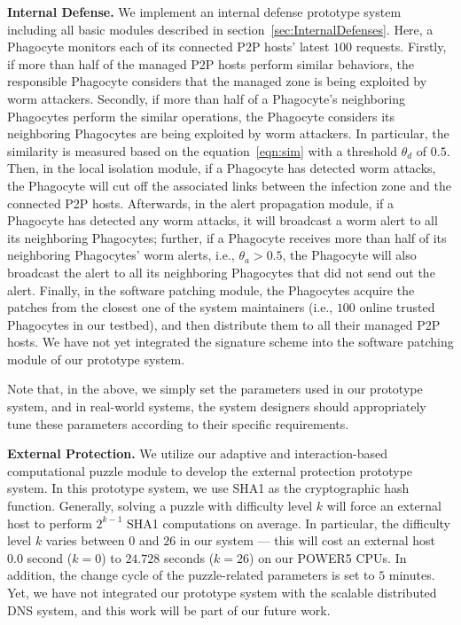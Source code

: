 \documentclass[times,10pt,twocolumn]{article}
\begin{document}
\textbf{Internal Defense.} We implement an internal defense
prototype system including all basic modules described in
section~\ref{sec:InternalDefenses}. Here, a Phagocyte monitors each
of its connected P2P hosts' latest $100$ requests. Firstly, if more
than half of the managed P2P hosts perform similar behaviors, the
responsible Phagocyte considers that the managed zone is being
exploited by worm attackers. Secondly, if more than half of a
Phagocyte's neighboring Phagocytes perform the similar operations,
the Phagocyte considers its neighboring Phagocytes are being
exploited by worm attackers. In particular, the similarity is
measured based on the equation~\ref{eqn:sim} with a threshold
$\theta_d$ of $0.5$. Then, in the local isolation module, if a
Phagocyte has detected worm attacks, the Phagocyte will cut off the
associated links between the infection zone and the connected P2P
hosts. Afterwards, in the alert propagation module, if a Phagocyte
has detected any worm attacks, it will broadcast a worm alert to all
its neighboring Phagocytes; further, if a Phagocyte receives more
than half of its neighboring Phagocytes' worm alerts, i.e.,
$\theta_a > 0.5$, the Phagocyte will also broadcast the alert to all
its neighboring Phagocytes that did not send out the alert. Finally,
in the software patching module, the Phagocytes acquire the patches
from the closest one of the system maintainers (i.e., $100$ online
trusted Phagocytes in our testbed), and then distribute them to all
their managed P2P hosts. We have not yet integrated the signature
scheme into the software patching module of our prototype system.

Note that, in the above, we simply set the parameters used in our
prototype system, and in real-world systems, the system designers
should appropriately tune these parameters according to their
specific requirements.




\textbf{External Protection.} We utilize our adaptive and
interaction-based computational puzzle module to develop the
external protection prototype system. In this prototype system, we
use SHA1 as the cryptographic hash function. Generally, solving a
puzzle with difficulty level $k$ will force an external host to
perform $2^{k-1}$ SHA1 computations on average. In particular, the
difficulty level $k$ varies between $0$ and $26$ in our system
--- this will cost an external host $0.0$ second ($k = 0$)
to $24.728$ seconds ($k = 26$) on our POWER5 CPUs. In addition, the
change cycle of the puzzle-related parameters is set to $5$ minutes.
Yet, we have not integrated our prototype system with the scalable
distributed DNS system, and this work will be part of our future
work.
\end{document}
